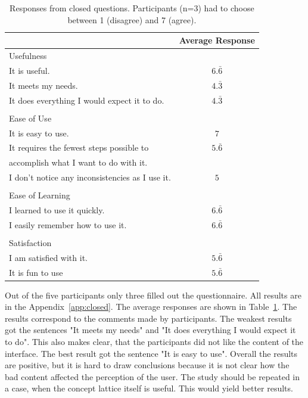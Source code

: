 \documentclass[11pt]{report}
\begin{document}
\begin{table}[h]
\caption{Responses from closed questions. Participants (n=3) had to choose between 1 (disagree) and 7 (agree). }
\label{table:closed}
\centering

\def\arraystretch{1.2}%
\begin{tabular}{ | l | c |}
\hline
& Average Response\\
\hline
\large{Usefulness}&\\
It is useful.&$6.\bar{6}$\\
It meets my needs.&$4.\bar{3}$\\
It does everything I would expect it to do.&$4.\bar{3}$\\
&\\
\large{Ease of Use}&\\
It is easy to use.&$7$\\
It requires the fewest steps possible to&$5.\bar{6}$\\
accomplish what I want to do with it.&\\
I don't notice any inconsistencies as I use it.&$5$\\
&\\
\large{Ease of Learning}&\\
I learned to use it quickly.&$6.\bar{6}$\\
I easily remember how to use it.&$6.\bar{6}$\\
&\\
\large{Satisfaction}&\\
I am satisfied with it.&$5.\bar{6}$\\
It is fun to use&$5.\bar{6}$\\

\hline

\end{tabular}
\end{table}

Out of the five participants only three filled out the questionnaire. All results are in the Appendix~\ref{app:closed}. The average responses are shown in Table~\ref{table:closed}. The results correspond to the comments made by participants. The weakest results got the sentences "It meets my needs" and "It does everything I would expect it to do". This also makes clear, that the participants did not like the content of the interface. The best result got the sentence "It is easy to use". Overall the results are positive, but it is hard to draw conclusions because it is not clear how the bad content affected the perception of the user. The study should be repeated in a case, when the concept lattice itself is useful. This would yield better results.
\end{document}
